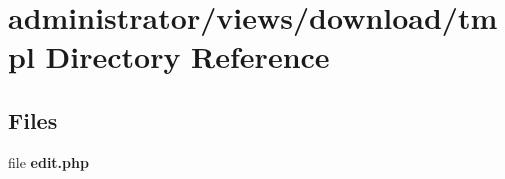 \section{administrator/views/download/tmpl Directory Reference}
\label{dir_7986b1b180c1f6ac285ec1536eaf823b}
\subsection*{Files}
\begin{DoxyCompactItemize}
\item 
file \textbf{ edit.\+php}
\end{DoxyCompactItemize}
